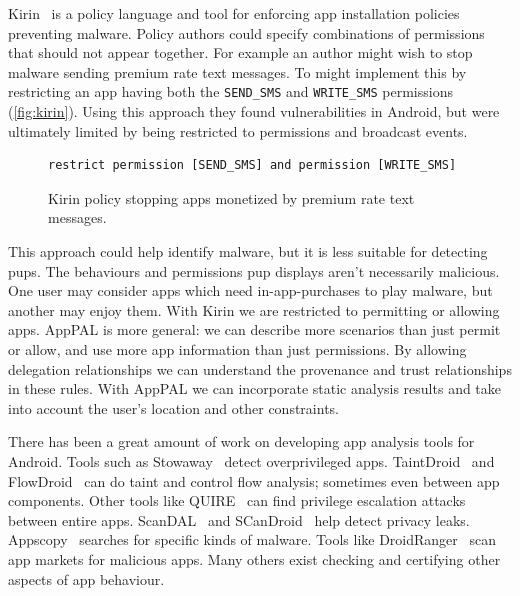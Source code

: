 \documentclass[]{llncs}
\begin{document}
Kirin~\cite{Enck:2009ko} is a policy language and tool for enforcing app installation policies preventing malware.
Policy authors could specify combinations of permissions that should not appear together.
For example an author might wish to stop malware sending premium rate text messages.
To might implement this by restricting an app having both the \texttt{SEND\_SMS} and \texttt{WRITE\_SMS} permissions (\autoref{fig:kirin}).
Using this approach they found vulnerabilities in Android, but were ultimately limited by being restricted to permissions and broadcast events.
\begin{figure}
\begin{lstlisting}
restrict permission [SEND_SMS] and permission [WRITE_SMS]
\end{lstlisting}
\caption{Kirin policy stopping apps monetized by premium rate text messages.}
\label{fig:kirin}
\end{figure}

This approach could help identify malware, but it is less suitable for detecting \acp{pup}.
The behaviours and permissions \ac{pup} displays aren't necessarily malicious.
One user may consider apps which need in-app-purchases to play malware, but another may enjoy them.
With Kirin we are restricted to permitting or allowing apps.
AppPAL is more general: we can describe more scenarios than just permit or allow, and use more app information than just permissions.
By allowing delegation relationships we can understand the provenance and trust relationships in these rules.
With AppPAL we can incorporate static analysis results and take into account the user's location and other constraints.

There has been a great amount of work on developing app analysis tools for Android.
Tools such as Stowaway~\cite{Felt:2011kj} detect overprivileged apps.
TaintDroid~\cite{Enck:2010uw} and FlowDroid~\cite{Fritz:2013vi} can do taint and control flow analysis; sometimes even between app components.
Other tools like QUIRE~\cite{Bugiel:2012ui} can find privilege escalation attacks between entire apps.
ScanDAL~\cite{Kim:2012vt} and SCanDroid~\cite{Fuchs:2009vi} help detect privacy leaks.
Appscopy~\cite{Feng:kPGZr_ja} searches for specific kinds of malware.
Tools like DroidRanger~\cite{Zhou:2012tb} scan app markets for malicious apps.
Many others exist checking and certifying other aspects of app behaviour.
\end{document}

